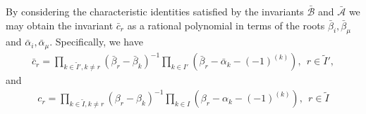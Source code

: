 \documentclass[12pt]{article}
\begin{document}
By considering the characteristic identities satisfied by the invariants $\bar{\mathcal{B}}$ and $\bar{\mathcal{A}}$ we may obtain the invariant $\bar{c}_r$ as a rational polynomial in terms of the roots $\bar{\beta}_i,\bar{\beta}_\mu$ and $\bar{\alpha}_i,\bar{\alpha}_\mu$. Specifically, we have \cite{GIW1}
\begin{align}
\bar{c}_r = \prod_{k\in \tilde{I}',k\neq r} \left(\bar{\beta}_r - \bar{\beta}_k\right)^{-1}\prod_{k\in
I'} \left(\bar{\beta}_r - \bar{\alpha}_k - (-1)^{(k)}\right),\ \ r\in \tilde{I}',
\end{align}
and
\begin{align}
c_r = \prod_{k\in \tilde{I},k\neq r} \left(\beta_r - \beta_k \right)^{-1}\prod_{k\in
I} \left(\beta_r - \alpha_k - (-1)^{(k)}\right),\ \ r\in \tilde{I}
\end{align}
\end{document}
